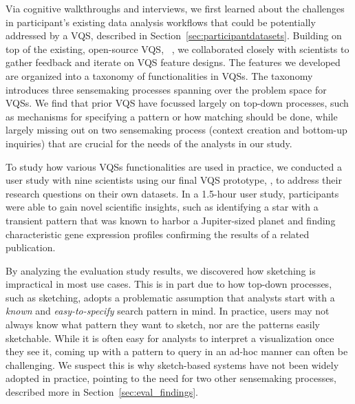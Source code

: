 \par Via cognitive walkthroughs and interviews, we first learned about the challenges in participant's existing data analysis workflows that could be potentially addressed by a VQS, described in Section~\ref{sec:participantdatasets}. %
Building on top of the existing, open-source VQS, \zv~\cite{Siddiqui2017,Siddiqui2017VLDB}, we collaborated closely with scientists to gather feedback and iterate on VQS feature designs. The features we developed are organized into a taxonomy of functionalities in VQSs. The taxonomy introduces three sensemaking processes spanning over the problem space for VQSs. We find that prior VQS have focussed largely on top-down processes, such as mechanisms for specifying a pattern or how matching should be done, while largely missing out on two sensemaking process (context creation and bottom-up inquiries) that are crucial for the needs of the analysts in our study. 
\par To study how various VQSs functionalities are used in practice, we conducted a user study with nine scientists using our final VQS prototype, \zvpp, to address their research questions on their own datasets. In a 1.5-hour user study, participants were able to gain novel scientific insights, such as identifying a star with a transient pattern that was known to harbor a Jupiter-sized planet and finding characteristic gene expression profiles confirming the results of a related publication.  
\par By analyzing the evaluation study results, we discovered how sketching is impractical in most use cases. This is in part due to how top-down processes, such as sketching, adopts a problematic assumption that analysts start with a {\em known} and {\em easy-to-specify} search pattern in mind. In practice, users may not always know what pattern they want to sketch, nor are the patterns easily sketchable. While it is often easy for analysts to interpret a visualization once they see it, coming up with a pattern to query in an ad-hoc manner can often be challenging. We suspect this is why sketch-based systems have not been widely adopted in practice, pointing to the need for two other sensemaking processes, described more in Section~\ref{sec:eval_findings}.
